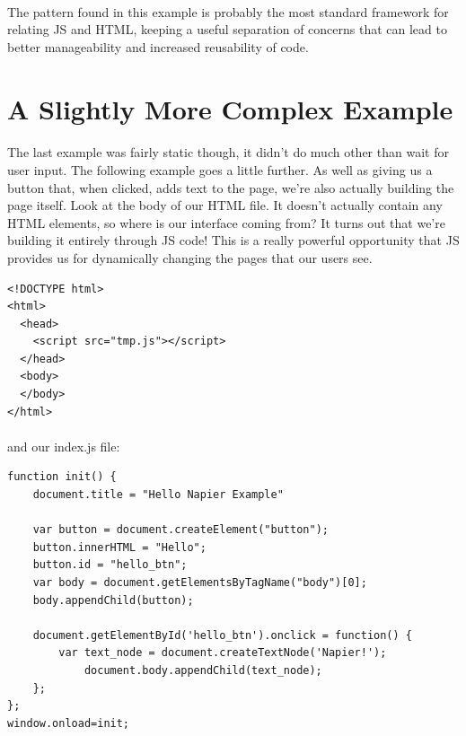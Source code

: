 \paragraph{} The pattern found in this example is probably the most standard framework for relating JS and HTML, keeping a useful separation of concerns that can lead to better manageability and increased reusability of code.



\section{A Slightly More Complex Example}
\paragraph{} The last example was fairly static though, it didn't do much other than wait for user input. The following example goes a little further. As well as giving us a button that, when clicked, adds text to the page, we're also actually building the page itself. Look at the body of our HTML file. It doesn't actually contain any HTML elements, so where is our interface coming from? It turns out that we're building it entirely through JS code! This is a really powerful opportunity that JS provides us for dynamically changing the pages that our users see.

\begin{lstlisting}
<!DOCTYPE html>
<html>
  <head>
    <script src="tmp.js"></script>
  </head>
  <body>
  </body>
</html>
\end{lstlisting}

\paragraph{} and our index.js file:

\begin{lstlisting}
function init() {
    document.title = "Hello Napier Example"

    var button = document.createElement("button");
    button.innerHTML = "Hello";
    button.id = "hello_btn";
    var body = document.getElementsByTagName("body")[0];
    body.appendChild(button);

    document.getElementById('hello_btn').onclick = function() {
        var text_node = document.createTextNode('Napier!');
            document.body.appendChild(text_node);   
    };
};
window.onload=init;
\end{lstlisting}


